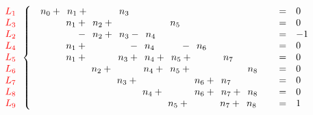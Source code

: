 \documentclass[10pt,a2paper]{article}
\begin{document}
\vspace{3em}
${\color{red}\begin{array}{c} L_1\\ L_3\\ L_2\\ L_4\\ L_5\\ L_6\\ L_7\\L_8\\L_9\end{array}    }
\left\{\begin{array}{l c l}\phantom{0}n_{0} +\phantom{0}n_{1} +\phantom{ 0n_{2} +\ } \phantom{0}n_{3} \phantom{+\ 0n_{4} +\ } \phantom{ 0n_{5} +\ } \phantom{ 0n_{6} +\ } \phantom{ 0n_{7} +\ } \phantom{ 0n_{8} +\ }&=& 0\\\phantom{ 0n_{0} +\ } \phantom{0}n_{1} +\phantom{0}n_{2} +\phantom{ 0n_{3} +\ } \phantom{ 0n_{4} +\ } \phantom{0}n_{5} \phantom{+\ 0n_{6} +\ } \phantom{ 0n_{7} +\ } \phantom{ 0n_{8} +\ }&=& 0\\\phantom{0n_{0} +\ }\phantom{0n_{1} }-\phantom{0}n_{2} +\phantom{ 0}n_{3} - \phantom{0}n_{4} \phantom{+\ 0n_{5} +\ } \phantom{ 0n_{6} +\ } \phantom{ 0n_{7} +\ } \phantom{ 0n_{8} +\ }&=& -1\\\phantom{0n_{0} +\ }\phantom{ 0}n_{1} +  \phantom{ 0n_{2} +\ } \phantom{0n_{3}  }- \phantom{0}n_{4} \phantom{+\ 0n_{5}  }- \phantom{0}n_{6} \phantom{+\ 0n_{7} +\ } \phantom{ 0n_{8} +\ }&=& 0\\\phantom{ 0n_{0} +\ } \phantom{0}n_{1} +\phantom{ 0n_{2} +\ } \phantom{0}n_{3} +\phantom{0}n_{4} +\phantom{0}n_{5} +\phantom{ 0n_{6} +\ } \phantom{0}n_{7} \phantom{+\ 0n_{8} +\ }&=& 0\\\phantom{ 0n_{0} +\ } \phantom{ 0n_{1} +\ } \phantom{0}n_{2} +\phantom{ 0n_{3} +\ } \phantom{0}n_{4} +\phantom{0}n_{5} +\phantom{ 0n_{6} +\ } \phantom{ 0n_{7} +\ } \phantom{0}n_{8} &=& 0\\\phantom{ 0n_{0} +\ } \phantom{ 0n_{1} +\ } \phantom{ 0n_{2} +\ } \phantom{0}n_{3} +\phantom{ 0n_{4} +\ } \phantom{ 0n_{5} +\ } \phantom{0}n_{6} +\phantom{0}n_{7} \phantom{+\ 0n_{8} +\ }&=& 0\\\phantom{ 0n_{0} +\ } \phantom{ 0n_{1} +\ } \phantom{ 0n_{2} +\ } \phantom{ 0n_{3} +\ } \phantom{0}n_{4} +\phantom{ 0n_{5} +\ } \phantom{0}n_{6} +\phantom{0}n_{7} +\phantom{0}n_{8} &=& 0\\\phantom{ 0n_{0} +\ } \phantom{ 0n_{1} +\ } \phantom{ 0n_{2} +\ } \phantom{ 0n_{3} +\ } \phantom{ 0n_{4} +\ } \phantom{0}n_{5} +\phantom{ 0n_{6} +\ } \phantom{0}n_{7} +\phantom{0}n_{8} &=& 1\\\end{array}\right.$
\end{document}

